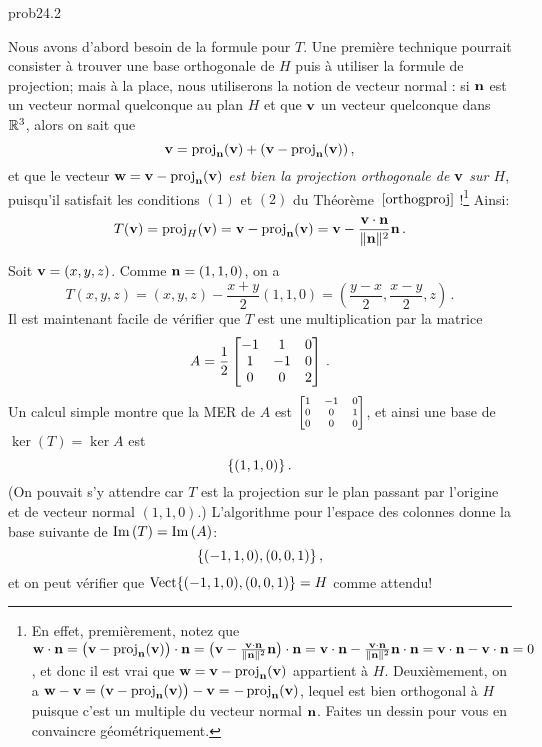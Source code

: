 \begin{sol}{prob24.2}
\begin{enumerate}[]
\soln Nous avons d'abord besoin de la formule pour $T$.  
Une première technique pourrait consister à  trouver une base orthogonale de $H$ puis à utiliser la formule de projection; mais à la place, nous utiliserons la notion de vecteur normal : si $\nn$ est un vecteur normal quelconque au plan $H$ et que $\vv$ un vecteur quelconque dans $\R^3$, alors on sait que
$$ \vv= \proj_\nn(\vv) + (\vv-\proj_\nn(\vv))\,,$$ 
et que le vecteur $\ww=\vv-\proj_\nn(\vv)$ {\it est bien la projection orthogonale de $\vv$ sur $H$}, puisqu'il satisfait les conditions $(1)$ et $(2)$ du Théorème~$\ref{orthogproj}$ !\footnote{En effet, premièrement, notez que $\ww\cdot \nn=\big(\vv-\proj_\nn(\vv)\big)\cdot \nn =\big( \vv- \frac{\vv\cdot \nn}{\|\nn\|^2}\nn\big)\cdot \nn= \vv\cdot \nn - \frac{\vv\cdot \nn}{\|\nn\|^2}\nn\cdot \nn=\vv\cdot \nn-\vv\cdot \nn=0$, et donc il est vrai que $\ww=\vv-\proj_\nn(\vv)$ appartient à $H$. Deuxièmement, on a $\ww-\vv=(\vv-\proj_\nn(\vv)\big)-\vv= -\proj_\nn(\vv)$, lequel est bien orthogonal à $H$ puisque c'est un multiple du vecteur normal $\nn$. Faites un dessin pour vous en convaincre géométriquement.} Ainsi: 
$$   T(\vv) = \proj_H(\vv)=  \vv-\proj_\nn(\vv) =\vv- \frac{\vv\cdot \nn}{\|\nn\|^2}\nn\,. $$

Soit $\vv=(x,y,z)$. Comme $\nn=(1,1,0)$, on a
$$T(x,y,z)=(x,y,z)- \frac{x+y}{2}(1,1,0)=(\frac{y-x}2,\frac{x-y}2, z )\,.$$
Il est maintenant facile de vérifier que $T$ est une multiplication par la matrice 
$$A=\frac12\bmatrix -1&1&0\\1&-1&0\\ 0&0&2\endbmatrix\,.$$
Un calcul simple montre que la MER de $A$ est $\scriptsize\bmatrix 
1 & -1 & 0 \\
 0 & 0 & 1 \\
 0 & 0 & 0 \endbmatrix$, et ainsi une base de $\ker(T)= \ker A$ est
 $$\set{(1,1,0)}\,.$$ 
(On pouvait s'y attendre car $T$ est la projection sur le plan passant par l'origine et de vecteur normal $(1,1,0)$.)
L'algorithme pour l'espace des colonnes donne la base suivante de $\im (T) = \im( A)$:
$$\set{(-1,1,0), (0,0,1)}\,,$$
 et on peut v\'erifier que $\sp{(-1,1,0), (0,0,1)}=H$ comme attendu!

 
\medskip

\end{enumerate}

\end{sol}

